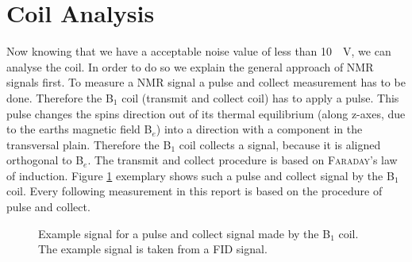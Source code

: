 \section{Coil Analysis}
\label{sec:CoilAnalyssis}
Now knowing that we have a acceptable noise value of less than \SI{10}{\mu \volt}, we can analyse the coil.
In order to do so we explain the general approach of NMR signals first.
To measure a NMR signal a pulse and collect measurement has to be done.
Therefore the B$_1$ coil (transmit and collect coil) has to apply a pulse.
This pulse changes the spins direction out of its thermal equilibrium (along z-axes, due to the earths magnetic field B$_e$) into a direction with a component in the transversal plain.
Therefore the B$_1$ coil collects a signal, because it is aligned orthogonal to B$_e$.
The transmit and collect procedure is based on \textsc{Faraday}'s law of induction.
Figure \ref{fig: PulsandcollectValesignal} exemplary shows such a pulse and collect signal by the B$_1$ coil.
Every following measurement in this report is based on the procedure of pulse and collect.

\begin{figure}[H]
    \centering
    
    \caption[Example signal for a pulse and collect signal made by the B$_1$ coil.]{Example signal for a pulse and collect signal made by the B$_1$ coil.
    The example signal is taken from a FID signal.}
    \label{fig: PulsandcollectValesignal}
\end{figure}

